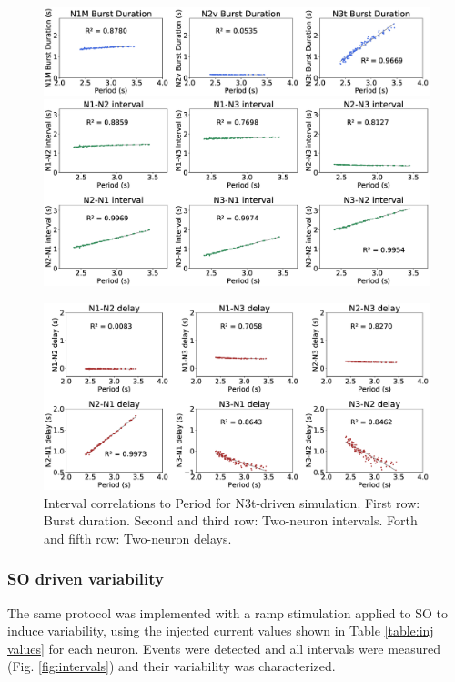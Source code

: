 \begin{figure}[h!]
    \centering
\includegraphics[width=\textwidth]{img/results-paper-modelo/figure8_row1.eps}
  \includegraphics[width=\textwidth]{img/results-paper-modelo/figure8_row2-3.eps}
      
  \includegraphics[width=\textwidth]{img/results-paper-modelo/figure8_row4-5.eps}

    \caption{Interval correlations to Period for N3t-driven simulation. First row: Burst duration. Second and third row: Two-neuron intervals. Forth and fifth row: Two-neuron delays.}
    \label{fig:invariant n3t test17}
\end{figure}

\subsubsection{SO driven variability}

The same protocol was implemented with a ramp stimulation applied to SO to induce variability, using the injected current values shown in Table \ref{table:inj values} for each neuron. Events were detected and all intervals were measured (Fig. \ref{fig:intervals}) and their variability was characterized. %

